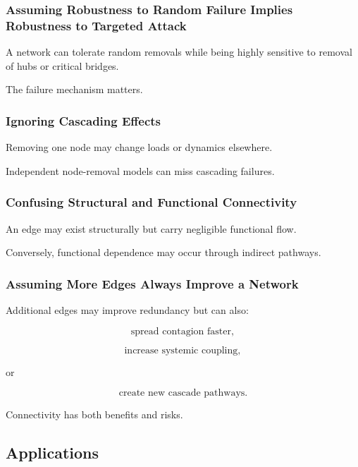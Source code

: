 \subsubsection{Assuming Robustness to Random Failure Implies Robustness to Targeted Attack}

A network can tolerate random removals while being highly sensitive to
removal of hubs or critical bridges.

The failure mechanism matters.

\subsubsection{Ignoring Cascading Effects}

Removing one node may change loads or dynamics elsewhere.

Independent node-removal models can miss cascading failures.

\subsubsection{Confusing Structural and Functional Connectivity}

An edge may exist structurally but carry negligible functional flow.

Conversely, functional dependence may occur through indirect pathways.

\subsubsection{Assuming More Edges Always Improve a Network}

Additional edges may improve redundancy but can also:

\[
\boxed{
\text{spread contagion faster},
}
\]

\[
\boxed{
\text{increase systemic coupling},
}
\]

or

\[
\boxed{
\text{create new cascade pathways}.
}
\]

Connectivity has both benefits and risks.

\subsection{Applications}
\label{subsec:network-science-applications}

